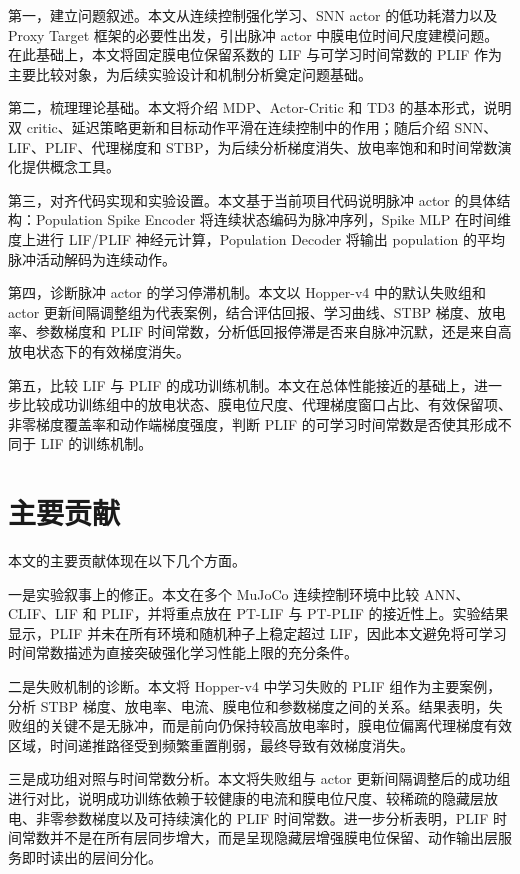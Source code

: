 \documentclass[UTF8,zihao=-4,oneside,openany]{ctexbook}
\begin{document}
第一，建立问题叙述。本文从连续控制强化学习、SNN actor 的低功耗潜力以及 Proxy Target 框架的必要性出发，引出脉冲 actor 中膜电位时间尺度建模问题。在此基础上，本文将固定膜电位保留系数的 LIF 与可学习时间常数的 PLIF 作为主要比较对象，为后续实验设计和机制分析奠定问题基础。

第二，梳理理论基础。本文将介绍 MDP、Actor-Critic 和 TD3 的基本形式，说明双 critic、延迟策略更新和目标动作平滑在连续控制中的作用；随后介绍 SNN、LIF、PLIF、代理梯度和 STBP，为后续分析梯度消失、放电率饱和和时间常数演化提供概念工具。

第三，对齐代码实现和实验设置。本文基于当前项目代码说明脉冲 actor 的具体结构：Population Spike Encoder 将连续状态编码为脉冲序列，Spike MLP 在时间维度上进行 LIF/PLIF 神经元计算，Population Decoder 将输出 population 的平均脉冲活动解码为连续动作。

第四，诊断脉冲 actor 的学习停滞机制。本文以 Hopper-v4 中的默认失败组和 actor 更新间隔调整组为代表案例，结合评估回报、学习曲线、STBP 梯度、放电率、参数梯度和 PLIF 时间常数，分析低回报停滞是否来自脉冲沉默，还是来自高放电状态下的有效梯度消失。

第五，比较 LIF 与 PLIF 的成功训练机制。本文在总体性能接近的基础上，进一步比较成功训练组中的放电状态、膜电位尺度、代理梯度窗口占比、有效保留项、非零梯度覆盖率和动作端梯度强度，判断 PLIF 的可学习时间常数是否使其形成不同于 LIF 的训练机制。

\section{主要贡献}
本文的主要贡献体现在以下几个方面。

一是实验叙事上的修正。本文在多个 MuJoCo 连续控制环境中比较 ANN、CLIF、LIF 和 PLIF，并将重点放在 PT-LIF 与 PT-PLIF 的接近性上。实验结果显示，PLIF 并未在所有环境和随机种子上稳定超过 LIF，因此本文避免将可学习时间常数描述为直接突破强化学习性能上限的充分条件。

二是失败机制的诊断。本文将 Hopper-v4 中学习失败的 PLIF 组作为主要案例，分析 STBP 梯度、放电率、电流、膜电位和参数梯度之间的关系。结果表明，失败组的关键不是无脉冲，而是前向仍保持较高放电率时，膜电位偏离代理梯度有效区域，时间递推路径受到频繁重置削弱，最终导致有效梯度消失。

三是成功组对照与时间常数分析。本文将失败组与 actor 更新间隔调整后的成功组进行对比，说明成功训练依赖于较健康的电流和膜电位尺度、较稀疏的隐藏层放电、非零参数梯度以及可持续演化的 PLIF 时间常数。进一步分析表明，PLIF 时间常数并不是在所有层同步增大，而是呈现隐藏层增强膜电位保留、动作输出层服务即时读出的层间分化。
\end{document}

